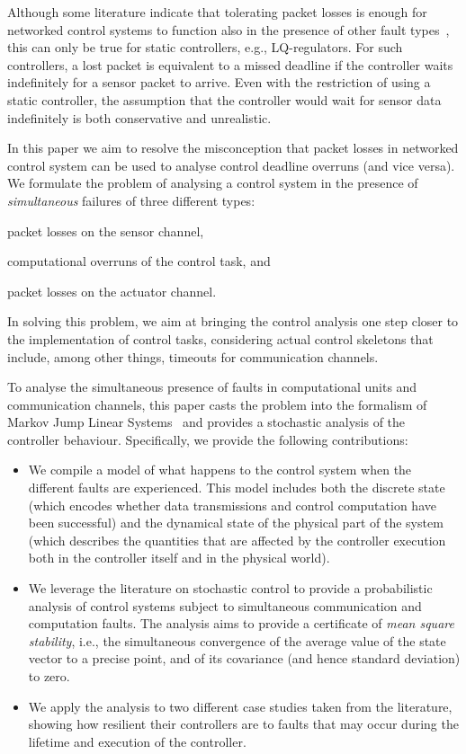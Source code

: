 Although some literature indicate that tolerating packet losses is enough for networked control systems to function also in the presence of other fault types~\cite{Kauer:2014, Ghosh:2018, Horssen:2016, Ling:2002, Linsenmayer:2017}, this can only be true for static controllers, e.g., LQ-regulators.
For such controllers, a lost packet is equivalent to a missed deadline if the controller waits indefinitely for a sensor packet to arrive.
Even with the restriction of using a static controller, the assumption that the controller would wait for sensor data indefinitely is both conservative and unrealistic.

In this paper we aim to resolve the misconception that packet losses in networked control system can be used to analyse control deadline overruns (and vice versa).
We formulate the problem of analysing a control system in the presence of \emph{simultaneous} failures of three different types:
\begin{enumerate*}[label=(\roman*)]
    \item packet losses on the sensor channel,
    \item computational overruns of the control task, and
    \item packet losses on the actuator channel.
\end{enumerate*}
In solving this problem, we aim at bringing the control analysis one step closer to the implementation of control tasks, considering actual control skeletons that include, among other things, timeouts for communication channels.

To analyse the simultaneous presence of faults in computational units and communication channels, this paper casts the problem into the formalism of Markov Jump Linear Systems~\cite{Costa:2005} and provides a stochastic analysis of the controller behaviour.
Specifically, we provide the following contributions:
\begin{itemize}
    \item We compile a model of what happens to the control system when the different faults are experienced. This model includes both the discrete state (which encodes whether data transmissions and control computation have been successful) and the dynamical state of the physical part of the system (which describes the quantities that are affected by the controller execution both in the controller itself and in the physical world).
    \item We leverage the literature on stochastic control to provide a probabilistic analysis of control systems subject to simultaneous communication and computation faults. The analysis aims to provide a certificate of \emph{mean square stability}, i.e., the simultaneous convergence of the average value of the state vector to a precise point, and of its covariance (and hence standard deviation) to zero.
    \item We apply the analysis to two different case studies taken from the literature, showing how resilient their controllers are to faults that may occur during the lifetime and execution of the controller.
\end{itemize}


